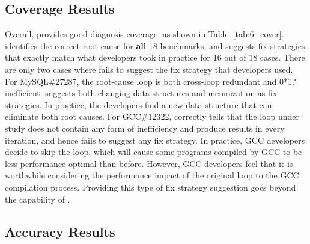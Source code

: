 \subsection{Coverage Results}
\label{sec:6_coverage}
Overall, \Tool provides good diagnosis coverage, as shown in Table~\ref{tab:6_cover}. 
\Tool identifies the correct root cause for \textbf{all} 18 benchmarks, and 
suggests fix strategies that exactly match what developers took in practice
for 16 out of 18 cases. There are only two cases where \Tool fails to suggest
the fix strategy that developers used. For MySQL\#27287, the root-cause loop
is both cross-loop redundant and 0*1? inefficient. \Tool suggests both changing
data structures and memoization as fix strategies. In practice, the developers
find a new data structure that can eliminate both root causes.
For GCC\#12322, \Tool correctly tells that the loop under study
does not contain any form of inefficiency and produce results in every 
iteration, and hence fails to suggest any fix strategy. In practice, GCC
developers decide to skip the loop, which will cause some programs compiled by
GCC
to be less performance-optimal than before. However, GCC developers feel
that it is worthwhile considering the performance impact of the original loop
to the GCC compilation process.
Providing this type of
fix strategy suggestion goes beyond the capability of \Tool.

\subsection{Accuracy Results}
\label{sec:6_result_acc}

